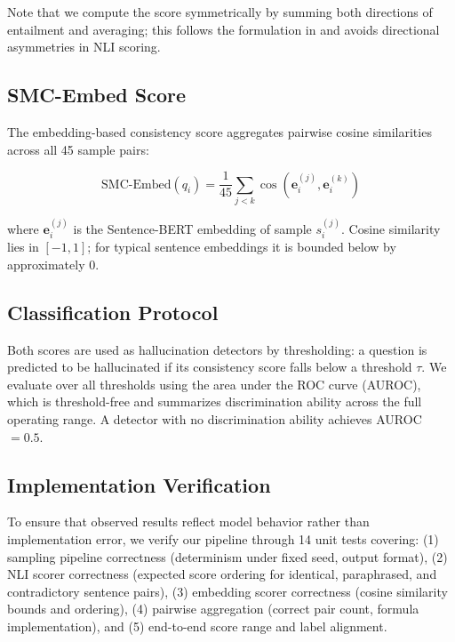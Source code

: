 Note that we compute the score symmetrically by summing both directions of entailment and averaging; this follows the formulation in \cite{Kuhn2023Semantic} and avoids directional asymmetries in NLI scoring.

\subsection{SMC-Embed Score}

The embedding-based consistency score aggregates pairwise cosine similarities across all 45 sample pairs:

\begin{equation}
  \text{SMC-Embed}(q_i) = \frac{1}{45} \sum_{j < k} \cos\left(\mathbf{e}_i^{(j)}, \mathbf{e}_i^{(k)}\right)
\end{equation}

where $\mathbf{e}_i^{(j)}$ is the Sentence-BERT \cite{Reimers2019Sentence} embedding of sample $s_i^{(j)}$. Cosine similarity lies in $[-1, 1]$; for typical sentence embeddings it is bounded below by approximately $0$.

\subsection{Classification Protocol}

Both scores are used as hallucination detectors by thresholding: a question is predicted to be hallucinated if its consistency score falls below a threshold $\tau$. We evaluate over all thresholds using the area under the ROC curve (AUROC), which is threshold-free and summarizes discrimination ability across the full operating range. A detector with no discrimination ability achieves AUROC $= 0.5$.

\subsection{Implementation Verification}

To ensure that observed results reflect model behavior rather than implementation error, we verify our pipeline through 14 unit tests covering: (1) sampling pipeline correctness (determinism under fixed seed, output format), (2) NLI scorer correctness (expected score ordering for identical, paraphrased, and contradictory sentence pairs), (3) embedding scorer correctness (cosine similarity bounds and ordering), (4) pairwise aggregation (correct pair count, formula implementation), and (5) end-to-end score range and label alignment.

